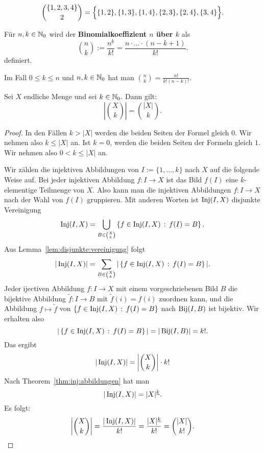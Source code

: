 \begin{bsp}
	\[
	\binom{\{1,2,3,4\}}{2} = \Bigl\{ \{1,2\},\{1,3\}, \{1,4\}, \{2,3\}, \{2,4\} ,\{3,4\} \Bigr\}.
	\]
\end{bsp} 


\begin{defn}
	Für $n,k \in \mathbb{N}_0$ wird der \textbf{Binomialkoeffizient  $n$ über $k$} als 
	\[
		\binom{n}{k}:= \frac{n^{\underline{k}}}{k!}  = \frac{n \cdot \ldots \cdot (n-k+1)}{k!}.
	\]
	definiert. 
\end{defn} 

\begin{bem}
	Im Fall $0 \le k \le n$ und $n,k \in \mathbb{N}_0$ hat man $\binom{n}{k} = \frac{n!}{k! (n-k)!}$. 
\end{bem} 


\begin{thm} \label{thm:k:elem:teilmengen} 
		Sei $X$ endliche Menge und sei $k \in \mathbb{N}_0$. Dann gilt: 
		\[
				\left| \binom{X}{k} \right| = \binom{|X|}{k}. 
		\]
\end{thm} 
\begin{proof} 
	In den Fällen $k > |X|$ werden die beiden Seiten der Formel gleich $0$. Wir nehmen also $k \le |X|$ an. Ist $k=0$, werden die beiden Seiten der Formeln gleich $1$. Wir nehmen also $0 < k \le |X|$ an. 
	
	Wir zählen die injektiven Abbildungen von $I:=\{1,\ldots,k\}$ nach $X$ auf die folgende  Weise auf. Bei jeder injektiven Abbildung $f : I \to X$ ist das Bild $f(I)$ eine $k$-elementige Teilmenge von $X$. Also kann man die injektiven Abbildungen $f: I \to X$  nach der Wahl von $f(I)$ gruppieren. Mit anderen Worten ist $\operatorname{Inj}(I,X)$ disjunkte Vereinigung
	\[
		\operatorname{Inj}(I,X)  = \bigcup_{B \in \binom{X}{k} } \left\{ f \in \operatorname{Inj}(I,X) \,:\, f(I) = B \right\}. 
	\]
	Aus Lemma~\ref{lem:disjunkte:vereinigung} folgt
	\[
		|\operatorname{Inj}(I,X) | = \sum_{B \in \binom{X}{k} } | \left\{ f \in \operatorname{Inj}(I,X) \,:\, f(I) = B \right\}|. 
	\]
	Jeder ijectiven Abbildung $ f: I \to X$ mit einem vorgeschriebenen Bild $B$ 
	die bijektive Abbildung $\tilde{f} : I \to B$ mit $\tilde{f}(i) = f(i)$ zuordnen kann, und die Abbildung $f \mapsto \tilde{f}$ von $\left\{ f \in \operatorname{Inj}(I,X) \,:\, f(I) = B \right\}$ nach $\operatorname{Bij}(I,B)$ ist bijektiv. 
	Wir erhalten also 
	\[
			| \left\{ f \in \operatorname{Inj}(I,X) \,:\, f(I) = B \right\}| = |\operatorname{Bij}(I,B)| = k!. 
	\]
	Das ergibt
	\[
		|\operatorname{Inj}(I,X) | = \left| \binom{X}{k} \right| \cdot k!
	\]
	Nach Theorem~\ref{thm:inj:abbildungen} hat man 
	\[
		|\operatorname{Inj}(I,X)| = |X|^{\underline{k}}. 
	\]
	Es folgt: 
	\[
		\left| \binom{X}{k} \right| = \frac{|\operatorname{Inj}(I,X) |}{k!} = \frac{|X|^{\underline{k}}}{k!} = \binom{|X|}{k!}. 
	\]
\end{proof} 

